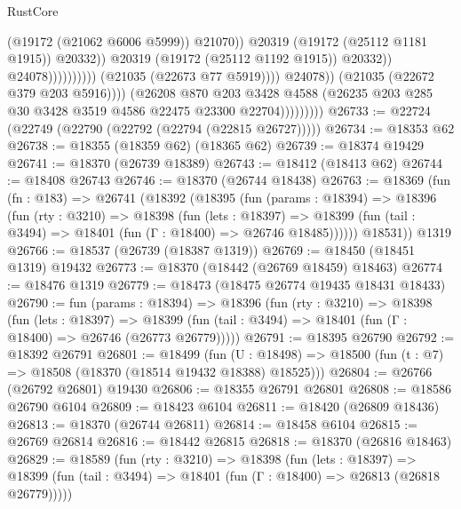\begin{lexlean}{RustCore}
\begin{coremodule}
                                                              (@19172 (@21062 @6006 @5999))
                                                              @21070))
                                                          @20319
                                                          (@19172 (@25112 @1181 @1915))
                                                          @20332))
                                                      @20319
                                                      (@19172 (@25112 @1192 @1915))
                                                      @20332))
                                                  @24078))))))))))
                              (@21035 (@22673 @77 @5919))))
                          @24078))
                      (@21035 (@22672 @379 @203 @5916))))
                  (@26208
                    @870
                    @203
                    @3428
                    @4588
                    (@26235 @203 @285 @30 @3428 @3519 @4586 @22475 @23300 @22704)))))))))
@26733 := @22724 (@22749 (@22790 (@22792 (@22794 (@22815 @26727)))))
@26734 := @18353 @62
@26738 := @18355 (@18359 @62) (@18365 @62)
@26739 := @18374 @19429
@26741 := @18370 (@26739 @18389)
@26743 := @18412 (@18413 @62)
@26744 := @18408 @26743
@26746 := @18370 (@26744 @18438)
@26763 := @18369
    (fun (fn : @183) =>
    @26741
      (@18392
        (@18395
          (fun (params : @18394) =>
          @18396
            (fun (rty : @3210) =>
            @18398
              (fun (lets : @18397) =>
              @18399 (fun (tail : @3494) => @18401 (fun (Γ : @18400) => @26746 @18485))))))
        @18531))
    @1319
@26766 := @18537 (@26739 (@18387 @1319))
@26769 := @18450 (@18451 @1319) @19432
@26773 := @18370 (@18442 (@26769 @18459) @18463)
@26774 := @18476 @1319
@26779 := @18473 (@18475 @26774 @19435 @18431 @18433)
@26790 := fun (params : @18394) =>
  @18396
    (fun (rty : @3210) =>
    @18398
      (fun (lets : @18397) =>
      @18399 (fun (tail : @3494) => @18401 (fun (Γ : @18400) => @26746 (@26773 @26779)))))
@26791 := @18395 @26790
@26792 := @18392 @26791
@26801 := @18499
    (fun (U : @18498) => @18500 (fun (t : @7) => @18508 (@18370 (@18514 @19432 @18388) @18525)))
@26804 := @26766 (@26792 @26801) @19430
@26806 := @18355 @26791 @26801
@26808 := @18586 @26790 @6104
@26809 := @18423 @6104
@26811 := @18420 (@26809 @18436)
@26813 := @18370 (@26744 @26811)
@26814 := @18458 @6104
@26815 := @26769 @26814
@26816 := @18442 @26815
@26818 := @18370 (@26816 @18463)
@26829 := @18589
    (fun (rty : @3210) =>
    @18398
      (fun (lets : @18397) =>
      @18399 (fun (tail : @3494) => @18401 (fun (Γ : @18400) => @26813 (@26818 @26779)))))

\end{coremodule}
\end{lexlean}
